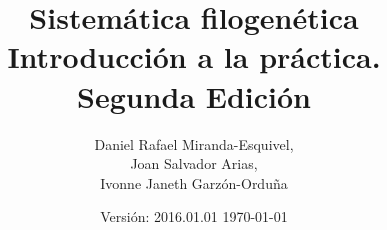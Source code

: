 \usepackage[english,spanish,activeacute]{babel}

\usepackage[utf8]{inputenc}


\usepackage{enumerate} 
\usepackage{enumitem}



\usepackage[round,authoryear]{natbib}

\usepackage{hyperref}
\usepackage{doi}

\usepackage{url}



\usepackage{framed}



\usepackage{tikz}

%
%





%

\usepackage{verdana}


\usepackage{inconsolata}



\usepackage{parskip}


\usepackage{makeidx}


\makeindex


%
\usepackage[a5paper,right=2.0cm,left=1.5cm,top=2.0cm,bottom=2.0cm,headsep=1.0cm,footskip=1.5cm]{geometry}


\hypersetup{%
%
      pdfcreator=Rafael Miranda-Esquivel,%
      pdfauthor=Rafael Miranda-Esquivel,
      pdfsubject=Intro. a la Sistem\'atica. 2 Edici\'on (2016),
%
   }




\title{Sistem\'atica filogen\'etica\\Introducci\'on a la pr\'actica.\\{\small{Segunda Edici\'on} }}

\author{Daniel Rafael Miranda-Esquivel,\\Joan Salvador Arias,\\Ivonne Janeth Garz\'on-Ordu\~na}


\date{Versi\'on: 2016.01.01 \today}


\usepackage{setspace}

\doublespacing{}
